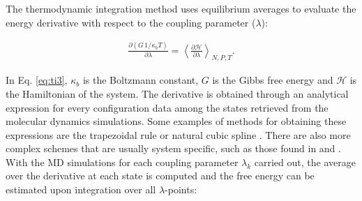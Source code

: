The thermodynamic integration method \cite{kirkwood1935} uses equilibrium averages to evaluate the energy derivative with respect to the coupling parameter ($\lambda$): 
%
%
%



\begin{equation}
\label{eq:ti3}
\begin{aligned}
\frac{\partial (G \, 1/\kappa_{b}T) }{\partial \lambda} =  \left \langle \frac{\partial \mathcal{H}}{\partial \lambda} \right \rangle _{N,P,T} .
\end{aligned}
\end{equation}

In Eq. \eqref{eq:ti3}, $\kappa_{b}$ is the Boltzmann constant, $G$ is the Gibbs free energy and $\mathcal{H}$ is the Hamiltonian of the system. The derivative is obtained through an analytical expression for every configuration data among the states retrieved from the molecular dynamics simulations. Some examples of methods for obtaining these expressions are the trapezoidal rule or natural cubic spline \cite{bareva}. There are also more complex schemes that are usually system specific, such as those found in  and . With the MD simulations for each coupling parameter $\lambda_{k}$ carried out, the average over the derivative at each state is computed and the free energy can be estimated upon integration over all $\lambda$-points:

